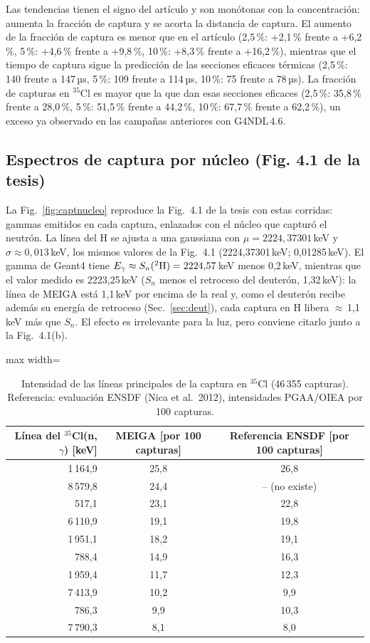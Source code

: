 \documentclass[11pt,a4paper]{article}
\begin{document}
Las tendencias tienen el signo del artículo y son monótonas con la concentración: aumenta la fracción de captura y se acorta la distancia de captura. El aumento de la fracción de captura es menor que en el artículo
(2,5\,\%: +2,1\,\% frente a +6,2\,\%, 5\,\%: +4,6\,\% frente a +9,8\,\%, 10\,\%: +8,3\,\% frente a +16,2\,\%),
mientras que el tiempo de captura sigue la predicción de las secciones eficaces térmicas (2,5\,\%: 140 frente a 147\,µs, 5\,\%: 109 frente a 114\,µs, 10\,\%: 75 frente a 78\,µs).
La fracción de capturas en $^{35}$Cl es mayor que la que dan esas secciones eficaces (2,5\,\%: 35,8\,\% frente a 28,0\,\%, 5\,\%: 51,5\,\% frente a 44,2\,\%, 10\,\%: 67,7\,\% frente a 62,2\,\%),
un exceso ya observado en las campañas anteriores con G4NDL\,4.6.
\subsection{Espectros de captura por núcleo (Fig. 4.1 de la tesis)}\label{sec:captura_nucleo}
La Fig.~\ref{fig:captnucleo} reproduce la Fig.~4.1 de la tesis con estas corridas: gammas emitidos en cada captura, enlazados con el núcleo que capturó el neutrón.
La línea del H se ajusta a una gaussiana con $\mu = 2224{,}37301$\,keV y $\sigma \approx 0{,}013$\,keV, los mismos valores de la Fig.~4.1 (2224,37301\,keV; 0,01285\,keV). El gamma de Geant4 tiene $E_\gamma \approx S_n(^2{\rm H}) = 2224{,}57$\,keV menos 0,2\,keV, mientras que el valor medido es 2223,25\,keV ($S_n$ menos el retroceso del deuterón, 1,32\,keV):
la línea de MEIGA está 1,1\,keV por encima de la real y, como el deuterón recibe además su energía de retroceso (Sec.~\ref{sec:deut}), cada captura en H libera $\approx$\,1,1\,keV más que $S_n$. El efecto es irrelevante para la luz, pero conviene citarlo junto a la Fig.~4.1(b).
\begin{table}[H]\centering\small\begin{adjustbox}{max width=\linewidth}\begin{tabular}{rcc}\toprule
Línea del $^{35}$Cl(n,$\gamma$) [keV] & MEIGA [por 100 capturas] & Referencia ENSDF [por 100 capturas] \\\midrule
1\,164,9 & 25,8 & 26,8 \\
8\,579,8 & 24,4 & -- (no existe) \\
517,1 & 23,1 & 22,8 \\
6\,110,9 & 19,1 & 19,8 \\
1\,951,1 & 18,2 & 19,1 \\
788,4 & 14,9 & 16,3 \\
1\,959,4 & 11,7 & 12,3 \\
7\,413,9 & 10,2 & 9,9 \\
786,3 & 9,9 & 10,3 \\
7\,790,3 & 8,1 & 8,0 \\
\bottomrule\end{tabular}\end{adjustbox}\caption{Intensidad de las líneas principales de la captura en $^{35}$Cl (46\,355 capturas). Referencia: evaluación ENSDF (Nica et al.~2012), intensidades PGAA/OIEA por 100 capturas.}\end{table}
\end{document}
